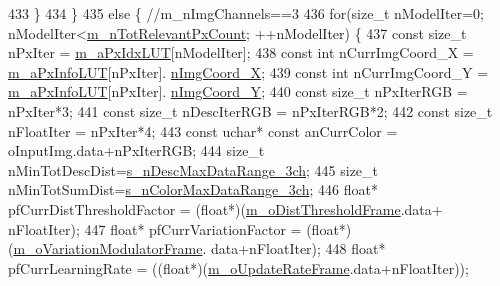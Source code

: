 \begin{DoxyCode}
433         \}
434     \}
435     \textcolor{keywordflow}{else} \{ \textcolor{comment}{//m\_nImgChannels==3}
436         \textcolor{keywordflow}{for}(\textcolor{keywordtype}{size\_t} nModelIter=0; nModelIter<\mbox{\hyperlink{class_background_subtractor_l_b_s_p_ac3b54f4d2dfa3a576475214f26501d85}{m\_nTotRelevantPxCount}}; ++nModelIter) \{
437             \textcolor{keyword}{const} \textcolor{keywordtype}{size\_t} nPxIter = \mbox{\hyperlink{class_background_subtractor_l_b_s_p_a06b4f0d3f24fa08bccd3c9eca085713e}{m\_aPxIdxLUT}}[nModelIter];
438             \textcolor{keyword}{const} \textcolor{keywordtype}{int} nCurrImgCoord\_X = \mbox{\hyperlink{class_background_subtractor_l_b_s_p_a74e73d4832ccdef652d93756582024db}{m\_aPxInfoLUT}}[nPxIter].
      \mbox{\hyperlink{struct_background_subtractor_l_b_s_p_1_1_px_info_base_a10966fe72f000045adede9e853156b48}{nImgCoord\_X}};
439             \textcolor{keyword}{const} \textcolor{keywordtype}{int} nCurrImgCoord\_Y = \mbox{\hyperlink{class_background_subtractor_l_b_s_p_a74e73d4832ccdef652d93756582024db}{m\_aPxInfoLUT}}[nPxIter].
      \mbox{\hyperlink{struct_background_subtractor_l_b_s_p_1_1_px_info_base_a42cb6eecda647b2a11b90ea420f2bc31}{nImgCoord\_Y}};
440             \textcolor{keyword}{const} \textcolor{keywordtype}{size\_t} nPxIterRGB = nPxIter*3;
441             \textcolor{keyword}{const} \textcolor{keywordtype}{size\_t} nDescIterRGB = nPxIterRGB*2;
442             \textcolor{keyword}{const} \textcolor{keywordtype}{size\_t} nFloatIter = nPxIter*4;
443             \textcolor{keyword}{const} uchar* \textcolor{keyword}{const} anCurrColor = oInputImg.data+nPxIterRGB;
444             \textcolor{keywordtype}{size\_t} nMinTotDescDist=\mbox{\hyperlink{_background_subtractor_su_b_s_e_n_s_e_8cpp_a5304f7a24033acdfa11a34dcb3d2720e}{s\_nDescMaxDataRange\_3ch}};
445             \textcolor{keywordtype}{size\_t} nMinTotSumDist=\mbox{\hyperlink{_background_subtractor_su_b_s_e_n_s_e_8cpp_a986ab69736996b917f1e964b2d064aad}{s\_nColorMaxDataRange\_3ch}};
446             \textcolor{keywordtype}{float}* pfCurrDistThresholdFactor = (\textcolor{keywordtype}{float}*)(\mbox{\hyperlink{class_background_subtractor_su_b_s_e_n_s_e_a491a1e2b81dee87a721a421719bf2836}{m\_oDistThresholdFrame}}.data+
      nFloatIter);
447             \textcolor{keywordtype}{float}* pfCurrVariationFactor = (\textcolor{keywordtype}{float}*)(\mbox{\hyperlink{class_background_subtractor_su_b_s_e_n_s_e_a47d9cf067ac639d95fcb810c894bb770}{m\_oVariationModulatorFrame}}.
      data+nFloatIter);
448             \textcolor{keywordtype}{float}* pfCurrLearningRate = ((\textcolor{keywordtype}{float}*)(\mbox{\hyperlink{class_background_subtractor_su_b_s_e_n_s_e_a90cb2cc5cbe3f2f0b01e06f514c8b569}{m\_oUpdateRateFrame}}.data+nFloatIter));

\end{DoxyCode}
